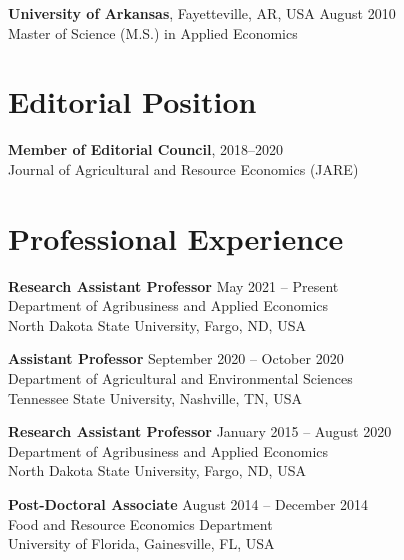 \documentclass[margin,line]{res}
\begin{document}
\begin{resume}
{\bf University of Arkansas}, Fayetteville, AR, USA \hfill August 2010 \\
Master of Science (M.S.) in Applied Economics \hfill %

\section{\sc Editorial Position}


{\bf Member of Editorial Council}, \hfill{2018--2020}\\
Journal of Agricultural and Resource Economics (JARE) 
\section{\sc Professional Experience}
{\bf Research Assistant Professor} \hfill{May 2021 -- Present} \\
Department of Agribusiness and Applied Economics \\
North Dakota State University, Fargo, ND, USA 

{\bf Assistant Professor} \hfill{September 2020 -- October 2020} \\
Department of Agricultural and Environmental Sciences \\
Tennessee State University, Nashville, TN, USA 

{\bf Research Assistant Professor} \hfill{January 2015 -- August 2020} \\
Department of Agribusiness and Applied Economics \\
North Dakota State University, Fargo, ND, USA 

{\bf Post-Doctoral Associate} \hfill{August 2014 -- December 2014} \\
Food and Resource Economics Department \\
University of Florida, Gainesville, FL, USA 



\end{resume}
\end{document}
